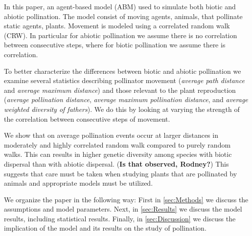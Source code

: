 In this paper, an agent-based model (ABM) used to simulate both biotic and
abiotic pollination.  The model consist of moving agents, animals, that
pollinate static agents, plants.  Movement is modeled using a correlated random
walk (CRW).  In particular for abiotic pollination we assume there is no
correlation between consecutive steps, where for biotic pollination we assume
there is correlation.

To better characterize the differences between biotic and abiotic pollination we
examine several statistics describing pollinator movement (\emph{average path
distance} and \emph{average maximum distance}) and those relevant to the plant
reproduction (\emph{average pollination distance}, \emph{average maximum
pollination distance}, and \emph{average weighted diversity of fathers}).  We do
this by looking at varying the strength of the correlation between consecutive
steps of movement.

We show that on average pollination events occur at larger distances in
moderately and highly correlated random walk compared to purely random walks.
This can results in higher genetic diversity among species with biotic dispersal
than with abiotic dispersal. ({\bf Is that observed, Rodney?}) This suggests
that care must be taken when studying plants that are pollinated by animals and
appropriate models must be utilized. 

We organize the paper in the following way: First in \autoref{sec:Methods} we
discuss the assumptions and model parameters. Next, in \autoref{sec:Results} we
discuss the model results, including statistical results. Finally, in
\autoref{sec:Discussion} we discuss the implication of the model and its results
on the study of pollination.
